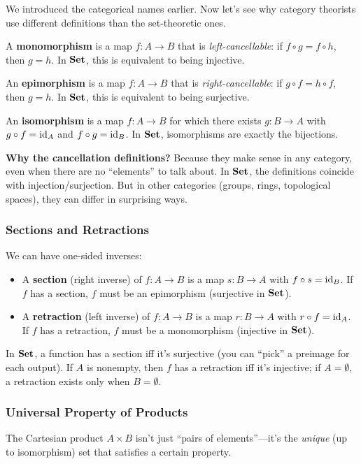 \begin{goingdeeper}
We introduced the categorical names earlier. Now let's see why category theorists use different definitions than the set-theoretic ones.

A \textbf{monomorphism} is a map $f: A \to B$ that is \emph{left-cancellable}: if $f \circ g = f \circ h$, then $g = h$. In $\mathbf{Set}$, this is equivalent to being injective.

An \textbf{epimorphism} is a map $f: A \to B$ that is \emph{right-cancellable}: if $g \circ f = h \circ f$, then $g = h$. In $\mathbf{Set}$, this is equivalent to being surjective.

An \textbf{isomorphism} is a map $f: A \to B$ for which there exists $g: B \to A$ with $g \circ f = \operatorname{id}_A$ and $f \circ g = \operatorname{id}_B$. In $\mathbf{Set}$, isomorphisms are exactly the bijections.

\textbf{Why the cancellation definitions?} Because they make sense in any category, even when there are no ``elements'' to talk about. In $\mathbf{Set}$, the definitions coincide with injection/surjection. But in other categories (groups, rings, topological spaces), they can differ in surprising ways.

\subsubsection*{Sections and Retractions}

We can have one-sided inverses:
\begin{itemize}
  \item A \textbf{section} (right inverse) of $f: A \to B$ is a map $s: B \to A$ with $f \circ s = \operatorname{id}_B$. If $f$ has a section, $f$ must be an epimorphism (surjective in $\mathbf{Set}$).
  \item A \textbf{retraction} (left inverse) of $f: A \to B$ is a map $r: B \to A$ with $r \circ f = \operatorname{id}_A$. If $f$ has a retraction, $f$ must be a monomorphism (injective in $\mathbf{Set}$).
\end{itemize}

In $\mathbf{Set}$, a function has a section iff it's surjective (you can ``pick'' a preimage for each output). If $A$ is nonempty, then $f$ has a retraction iff it's injective; if $A = \emptyset$, a retraction exists only when $B = \emptyset$.

\subsubsection*{Universal Property of Products}

The Cartesian product $A \times B$ isn't just ``pairs of elements''---it's the \emph{unique} (up to isomorphism) set that satisfies a certain property.


\end{goingdeeper}

